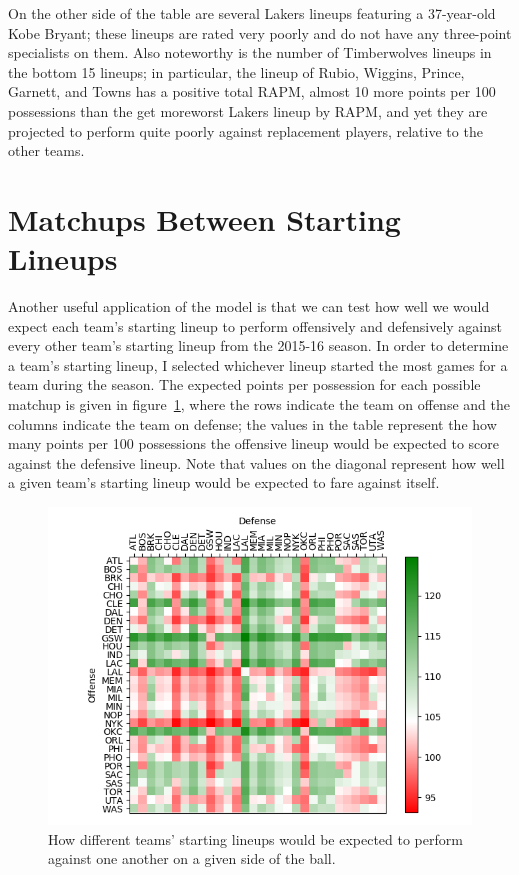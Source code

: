 On the other side of the table are several Lakers lineups featuring a 37-year-old
Kobe Bryant; these lineups are rated very poorly and do not have any three-point
specialists on them. Also noteworthy is the number of Timberwolves lineups in the
bottom 15 lineups; in particular, the lineup of Rubio, Wiggins, Prince, Garnett, and
Towns has a positive total RAPM, almost 10 more points per 100 possessions than the
get moreworst Lakers lineup by RAPM, and yet they are projected to perform quite
poorly against replacement players, relative to the other teams.

\section{Matchups Between Starting Lineups}

Another useful application of the model is that we can test how well we would expect
each team's starting lineup to perform offensively and defensively against every
other team's starting lineup from the 2015-16 season. In order to determine a team's
starting lineup, I selected whichever lineup started the most games for a team
during the season. The expected points per possession for each possible matchup is
given in figure~\ref{fig:off_def_mat}, where the rows indicate the team on offense
and the columns indicate the team on defense; the values in the table represent the
how many points per 100 possessions the offensive lineup would be expected to score
against the defensive lineup. Note that values on the diagonal represent how well a
given team's starting lineup would be expected to fare against itself.

\begin{figure}
    \centering
    \includegraphics[width=\textwidth]{figures/off_def_matrix}
    \caption{How different teams' starting lineups would be expected to perform
    against one another on a given side of the ball.}
    \label{fig:off_def_mat}
\end{figure}

